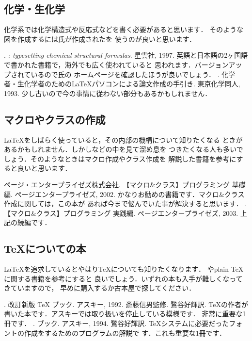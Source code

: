 \subsection{化学・生化学}
化学系では化学構造式や反応式などを書く必要があると思います．
そのような図を作成するには氏が作成された{\XyMTeX}を
使うのが良いと思います．
\begin{myreferences}
%
. \newblock
{\em {\XyMTeX:} typesetting chemical structural formulas}.
星雲社, 1997. 
\sanko
英語と日本語の2ヶ国語で書かれた書籍で，海外でも広く使われていると
思われます．バージョンアップされているので氏の
ホームページを確認したほうが良いでしょう．
%	
\iiiemdash. \newblock
化学者・生化学者のための\LaTeX\zdash パソコンによる論文作成の手引き. 
東京化学同人, 1993. 
\sanko
少し古いので今の事情に従わない部分もあるかもしれません．
%
\end{myreferences}

\subsection{マクロやクラスの作成}%
{\LaTeX}をしばらく使っていると，その内部の機構について知りたくなる
ときがあるかもしれません．しかしなどの中を見て溜め息を
つきたくなる人も多いでしょう．そのようなときはマクロ作成やクラス作成を
解説した書籍を参考にすると良いと思います．
%
\begin{myreferences}
%
 ページ・エンタープライゼズ株式会社.
  {\LaTeXe}【マクロ\&クラス】プログラミング 基礎編. \newblock
  ページエンタープライゼズ, 2002. 
\sanko
 かなりお勧めの書籍です．マクロ\&クラス作成に関しては，この本が
 あれば今まで悩んでいた事が解決すると思います．
%	
 .
  {\LaTeXe}【マクロ\&クラス】プログラミング 実践編. \newblock
  ページエンタープライゼズ, 2003. 
\sanko
 上記の続編です．
\end{myreferences}

\subsection{{\TeX}についての本}
{\LaTeX}を追求しているとやはり{\TeX}についても知りたくなります．
やplain {\TeX}に関する書籍を参考にすると
良いでしょう．いずれの本も入手が難しくなってきていますので，
早めに購入するか古本屋で探してください．
%
\begin{myreferences}
  . \newblock
  改訂新版 {\TeX} ブック.
  アスキー, 1992.   
  斎藤信男監修. 
  鷺谷好輝訳.
  \sanko
  {\TeX}の作者が書いた本です．アスキーでは取り扱いを停止している模様です．
  非常に重要な1冊です．
% 
  \iiiemdash. \newblock
  {\MF} ブック.
  アスキー, 1994.  
  鷺谷好輝訳.
  \sanko
  {\TeX}システムに必要だったフォントの作成をするためのプログラムの解説で
  す．これも重要な1冊です．
% 
\end{myreferences}

